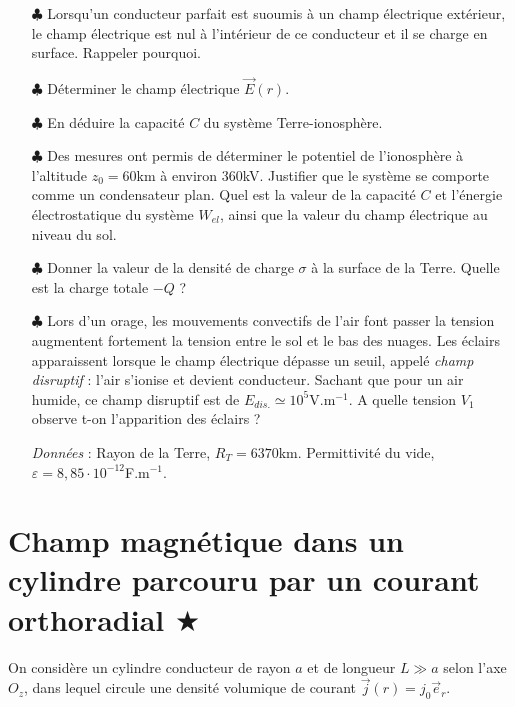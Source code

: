 \documentclass{report}
\begin{document}
\begin{itemize}

	\item[$\clubsuit$] Lorsqu'un conducteur parfait est suoumis à un champ électrique extérieur, le champ électrique est nul à l'intérieur de ce conducteur et il se charge en surface. Rappeler pourquoi.
	
	\item[$\clubsuit$] Déterminer le champ électrique $\vec{E}(r)$.
		
	\item[$\clubsuit$] En déduire la capacité $C$ du système Terre-ionosphère.
	
	\item[$\clubsuit$] Des mesures ont permis de déterminer le potentiel de l'ionosphère à l'altitude $z_0=60$km à environ 360kV. Justifier que le système se comporte comme un condensateur plan. Quel est la valeur de la capacité $C$ et l'énergie électrostatique du système $W_{el}$, ainsi que la valeur du champ électrique au niveau du sol.
	
	\item[$\clubsuit$] Donner la valeur de la densité de charge $\sigma$ à la surface de la Terre. Quelle est la charge totale $-Q$ ?
	
	\item[$\clubsuit$] Lors d'un orage, les mouvements convectifs de l'air font passer la tension augmentent fortement la tension entre le sol et le bas des nuages. Les éclairs apparaissent lorsque le champ électrique dépasse un seuil, appelé \textit{champ disruptif} : l'air s'ionise et devient conducteur. Sachant que pour un air humide, ce champ disruptif est de $E_{dis.}\simeq10^{5}$V.m$^{-1}$. A quelle tension $V_1$ observe t-on l'apparition des éclairs ?
	
	
	\textit{Données} : Rayon de la Terre, $R_T=6370$km. Permittivité du vide, $\varepsilon=8,85\cdot10^{-12}$F.m$^{-1}$.
	
\end{itemize}

\newpage

\section*{Champ magnétique dans un cylindre parcouru par un courant orthoradial $\bigstar$}

On considère un cylindre conducteur de rayon $a$ et de longueur $L\gg a$ selon l'axe $O_z$, dans lequel circule une densité volumique de courant $\vec{j}(r)=j_0\vec{e}_r$.
\end{document}
